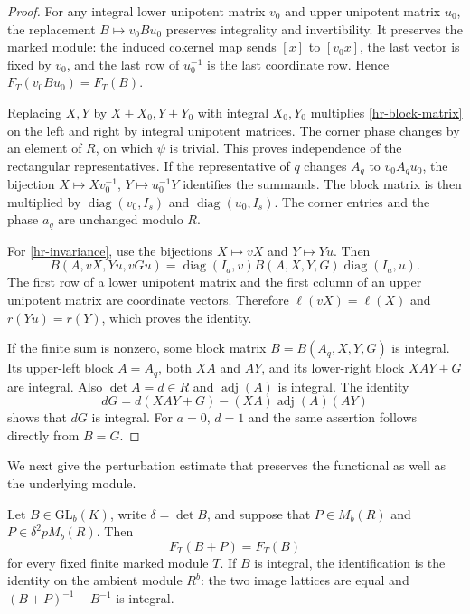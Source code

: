 \begin{proof}
For any integral lower unipotent matrix $v_0$ and upper
unipotent matrix $u_0$, the replacement $B\mapsto v_0Bu_0$
preserves integrality and invertibility. It preserves the marked
module: the induced cokernel map sends $[x]$ to $[v_0x]$,
the last vector is fixed by $v_0$, and the last row of $u_0^{-1}$
is the last coordinate row. Hence $F_T(v_0Bu_0)=F_T(B)$.

Replacing $X,Y$ by $X+X_0,Y+Y_0$ with integral $X_0,Y_0$
multiplies \eqref{hr-block-matrix} on the left and right by
integral unipotent matrices. The corner phase changes by an
element of $R$, on which $\psi$ is trivial. This proves
independence of the rectangular representatives.
If the representative of $q$ changes $A_q$ to $v_0A_qu_0$,
the bijection $X\mapsto Xv_0^{-1}$, $Y\mapsto u_0^{-1}Y$
identifies the summands. The block matrix is then multiplied
by $\operatorname{diag}(v_0,I_s)$ and
$\operatorname{diag}(u_0,I_s)$. The corner entries and the
phase $a_q$ are unchanged modulo $R$.

For \eqref{hr-invariance}, use the bijections
$X\mapsto vX$ and $Y\mapsto Yu$. Then
\[
 B(A,vX,Yu,vGu)=\operatorname{diag}(I_a,v)
                  B(A,X,Y,G)\operatorname{diag}(I_a,u).
\]
The first row of a lower unipotent matrix and the first column
of an upper unipotent matrix are coordinate vectors. Therefore
$\ell(vX)=\ell(X)$ and $r(Yu)=r(Y)$, which proves the identity.

If the finite sum is nonzero, some block matrix
$B=B(A_q,X,Y,G)$ is integral. Its upper-left block $A=A_q$,
both $XA$ and $AY$, and its lower-right block $XAY+G$ are
integral. Also $\det A=d\in R$ and $\operatorname{adj}(A)$
is integral. The identity
\[
 dG=d(XAY+G)-(XA)\operatorname{adj}(A)(AY)
\]
shows that $dG$ is integral. For $a=0$, $d=1$ and the same
assertion follows directly from $B=G$.
\end{proof}

We next give the perturbation estimate that preserves the
functional as well as the underlying module.

\begin{lemma}\label{hr-perturbation}
Let $B\in\mathrm{GL}_b(K)$, write $\delta=\det B$, and
suppose that $P\in M_b(R)$ and
$P\in\delta^2pM_b(R)$. Then
\[
                         F_T(B+P)=F_T(B)
\]
for every fixed finite marked module $T$.
If $B$ is integral, the identification is the identity on the
ambient module $R^b$: the two image lattices are equal and
$(B+P)^{-1}-B^{-1}$ is integral.
\end{lemma}

